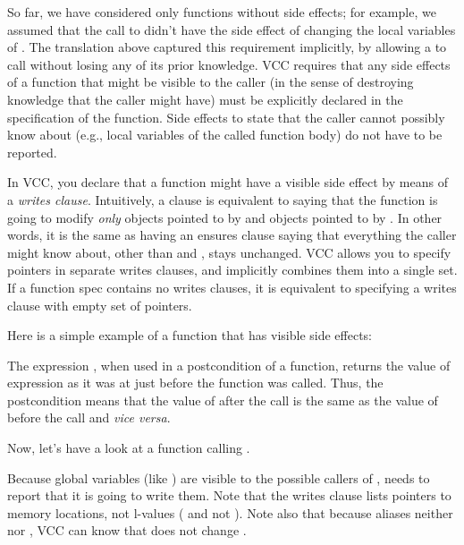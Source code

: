 So far, we have considered only functions without side effects; for
example, we assumed that the call to  didn't have the side
effect of changing the local variables of . The
translation above captured this requirement implicitly, by allowing a
 to call  without losing any of its prior
knowledge. VCC requires that any side effects of a function that might
be visible to the caller (in the sense of destroying knowledge that
the caller might have) must be explicitly declared in the
specification of the function. Side effects to state that the caller
cannot possibly know about (e.g., local variables of the called function
body) do not have to be reported. 

In VCC, you declare that a function might have a visible side effect
by means of a \emph{writes clause}. 
Intuitively, a clause  is equivalent to saying
that the function is going to modify \emph{only} objects pointed to by 
and objects pointed to by .
In other words, it is the same as having an ensures clause
saying that everything the caller might know about, other than 
 and , stays unchanged. VCC allows you
to specify pointers in separate writes clauses, and implicitly
combines them into a single set. If a function spec contains no writes clauses, 
it is equivalent to specifying a writes clause with empty set of pointers.

Here is a simple example of a function that has visible side effects:

\noindent
The expression , when used in a postcondition of a function,
returns the value of expression 
as it was at just before the function was called. 
Thus, the postcondition means that the value of  after the call
is the same as the value of  before the call and \emph{vice versa}.

Now, let's have a look at a function calling .


Because global variables (like ) are visible to the possible callers
of ,  needs to report that it is going to write
them.
Note that the writes clause lists pointers to memory locations, not l-values
(\ie {} and not ).
Note also that because  aliases neither  nor , VCC can
know that  does not change .

